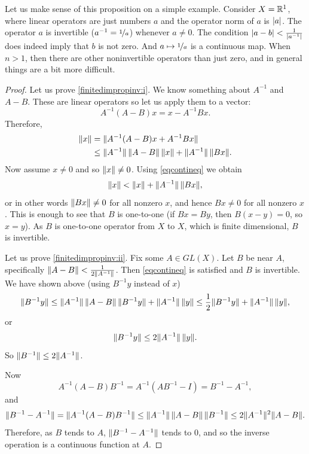 Let us make sense of this proposition on a simple example.
Consider $X={\mathbb{R}}^1$, where linear operators are just
numbers $a$ and the operator norm of $a$ is $\lvert {a} \rvert$.
The operator $a$ is invertible ($a^{-1} = \nicefrac{1}{a}$)
whenever $a \not=0$.  The condition $\lvert {a-b} \rvert < \frac{1}{\lvert {a^{-1}} \rvert}$ does
indeed imply that $b$ is not zero.  And $a \mapsto \nicefrac{1}{a}$ is a continuous
map.
When $n > 1$, then there are other noninvertible operators than just zero,
and in general things are a bit more difficult.

\begin{proof}
Let us prove \ref{finitedimpropinv:i}.   We know something about $A^{-1}$
and $A-B$.  These are linear operators so let us
apply them to a vector:
\begin{equation*}
A^{-1}(A-B)x
=
x-A^{-1}Bx .
\end{equation*}
Therefore,
\begin{equation*}
\begin{split}
\lVert {x} \rVert 
& =
\lVert {A^{-1} (A-B)x + A^{-1}Bx} \rVert
\\
& \leq
\lVert {A^{-1}} \rVert\,\lVert {A-B} \rVert\, \lVert {x} \rVert + \lVert {A^{-1}} \rVert\,\lVert {Bx} \rVert .
\end{split}
\end{equation*}
Now assume $x \neq 0$ and so $\lVert {x} \rVert \neq 0$.
Using \eqref{eqcontineq} we obtain
\begin{equation*}
\lVert {x} \rVert < \lVert {x} \rVert + \lVert {A^{-1}} \rVert \, \lVert {Bx} \rVert ,
\end{equation*}
or in other words $\lVert {Bx} \rVert \not= 0$ for all nonzero $x$, and hence
$Bx \not= 0$ for all nonzero $x$.  This is enough to see that
$B$ is one-to-one (if $Bx = By$, then $B(x-y) = 0$, so $x=y$).
As $B$ is one-to-one operator from $X$ to $X$, which is finite dimensional,
$B$ is invertible.

Let us prove \ref{finitedimpropinv:ii}.  Fix some $A \in GL(X)$.  Let $B$ be near $A$,
specifically $\lVert {A-B} \rVert < \frac{1}{2 \lVert {A^{-1}} \rVert}$.
Then \eqref{eqcontineq} is satisfied and $B$ is invertible.
We have shown above (using $B^{-1}y$ instead of $x$)
\begin{equation*}
\lVert {B^{-1}y} \rVert \leq 
\lVert {A^{-1}} \rVert \, \lVert {A-B} \rVert \,  \lVert {B^{-1}y} \rVert + \lVert {A^{-1}} \rVert \, \lVert {y} \rVert
\leq
\frac{1}{2} \lVert {B^{-1}y} \rVert + \lVert {A^{-1}} \rVert\,\lVert {y} \rVert ,
\end{equation*}
or
\begin{equation*}
\lVert {B^{-1}y} \rVert \leq 
2\lVert {A^{-1}} \rVert\,\lVert {y} \rVert .
\end{equation*}
So
$
\lVert {B^{-1}} \rVert \leq 2 \lVert {A^{-1}} \rVert
$.

Now
\begin{equation*}
A^{-1}(A-B)B^{-1} = 
A^{-1}(AB^{-1}-I) = 
B^{-1}-A^{-1} ,
\end{equation*}
and
\begin{equation*}
\lVert {B^{-1}-A^{-1}} \rVert =
\lVert {A^{-1}(A-B)B^{-1}} \rVert \leq
\lVert {A^{-1}} \rVert\,\lVert {A-B} \rVert\,\lVert {B^{-1}} \rVert
\leq
2\lVert {A^{-1}} \rVert^2
\lVert {A-B} \rVert .
\end{equation*}
Therefore, as $B$ tends to $A$, $\lVert {B^{-1}-A^{-1}} \rVert$ tends to 0, and
so the inverse operation is a continuous function at $A$.
\end{proof}

